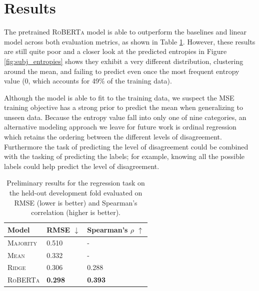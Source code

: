 \section{Results}
The pretrained \textsc{RoBERTa} model is able to outperform the baselines and linear model across both evaluation metrics, as shown in Table \ref{tab:subj_regression_results}. However, these results are still quite poor and a closer look at the predicted entropies in Figure \ref{fig:subj_entropies} shows they exhibit a very different distribution, clustering around the mean, and failing to predict even once the most frequent entropy value (0, which accounts for 49\% of the training data).

Although the model is able to fit to the training data, we suspect the MSE training objective has a strong prior to predict the mean when generalizing to unseen data. Because the entropy value fall into only one of nine categories, an alternative modeling approach we leave for future work is ordinal regression which retains the ordering between the different levels of disagreement. Furthermore the task of predicting the level of disagreement could be combined with the tasking of predicting the labels; for example, knowing all the possible labels could help predict the level of disagreement.

\begin{table}
    \centering
    \small
    \begin{tabular}{lll}
    \toprule
         Model &RMSE $\downarrow$ &Spearman's $\rho$ $\uparrow$ \\
         \midrule
         \textsc{Majority}&0.510 &-\\
         \textsc{Mean} &0.332 &-\\
         \textsc{Ridge} &0.306 &0.288 \\
         \midrule
         \textsc{RoBERTa} &\textbf{0.298} &\textbf{0.393}\\
         \bottomrule
    \end{tabular}
    \caption{Preliminary results for the regression task on the held-out development fold evaluated on RMSE (lower is better) and Spearman's correlation (higher is better).}
    \label{tab:subj_regression_results}
\end{table}

